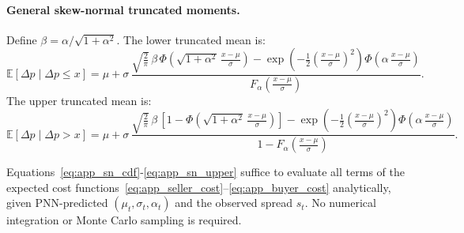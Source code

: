 \documentclass[11pt]{report}
\begin{document}
\paragraph{General skew-normal truncated moments.}
Define $\beta = \alpha / \sqrt{1 + \alpha^2}$. The lower truncated mean is:
\begin{equation}
  \mathbb{E}[\Delta p \mid \Delta p \leq x] = \mu + \sigma\,\frac{\displaystyle\sqrt{\frac{2}{\pi}}\,\beta\,\Phi\!\left(\sqrt{1 + \alpha^2}\,\frac{x - \mu}{\sigma}\right) - \exp\!\left(-\frac{1}{2}\!\left(\frac{x - \mu}{\sigma}\right)^{\!2}\right)\Phi\!\left(\alpha\,\frac{x - \mu}{\sigma}\right)}{F_\alpha\!\left(\frac{x - \mu}{\sigma}\right)}.
  \label{eq:app_sn_lower}
\end{equation}
The upper truncated mean is:
\begin{equation}
  \mathbb{E}[\Delta p \mid \Delta p > x] = \mu + \sigma\,\frac{\displaystyle\sqrt{\frac{2}{\pi}}\,\beta\,\left[1 - \Phi\!\left(\sqrt{1 + \alpha^2}\,\frac{x - \mu}{\sigma}\right)\right] - \exp\!\left(-\frac{1}{2}\!\left(\frac{x - \mu}{\sigma}\right)^{\!2}\right)\Phi\!\left(\alpha\,\frac{x - \mu}{\sigma}\right)}{1 - F_\alpha\!\left(\frac{x - \mu}{\sigma}\right)}.
  \label{eq:app_sn_upper}
\end{equation}

Equations~\eqref{eq:app_sn_cdf}-\eqref{eq:app_sn_upper} suffice to evaluate all terms of the expected cost functions~\eqref{eq:app_seller_cost}--\eqref{eq:app_buyer_cost} analytically, given PNN-predicted $(\mu_t, \sigma_t, \alpha_t)$ and the observed spread $s_t$. No numerical integration or Monte Carlo sampling is required.
\end{document}

